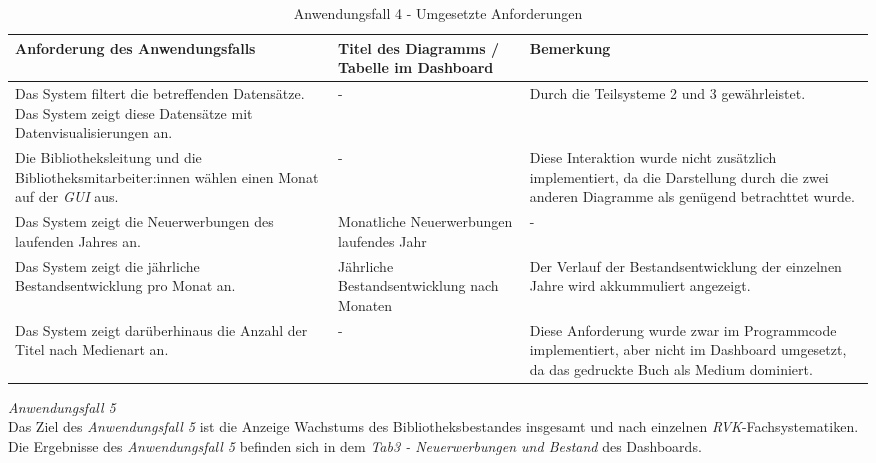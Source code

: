 \begingroup
    \setlength{\tabcolsep}{12pt} %
    \renewcommand{\arraystretch}{1.5} 
    \begin{table}[H]
        \centering
        \begin{adjustbox}{max width=\textwidth}
        \begin{tabular}{p{}p{}p{}}
           \toprule
           Anforderung des Anwendungsfalls        &Titel des Diagramms / Tabelle im Dashboard &Bemerkung\\
           \midrule
           Das System filtert die betreffenden Datensätze. Das System zeigt diese Datensätze mit Datenvisualisierungen an.&-&Durch die Teilsysteme 2  und 3 gewährleistet.\\
           Die Bibliotheksleitung und die Bibliotheksmitarbeiter:innen wählen einen Monat auf der \textit{\acrshort{GUI}} aus.&-&Diese Interaktion wurde nicht zusätzlich implementiert, da die Darstellung durch die zwei anderen Diagramme als genügend betrachttet wurde.\\
           Das System zeigt die Neuerwerbungen des laufenden Jahres an.&Monatliche Neuerwerbungen laufendes Jahr&-\\
           Das System zeigt die jährliche Bestandsentwicklung pro Monat an.&Jährliche Bestandsentwicklung nach Monaten&Der Verlauf der Bestandsentwicklung der einzelnen Jahre wird akkummuliert angezeigt.\\
           Das System zeigt darüberhinaus die Anzahl der Titel nach Medienart an.&-&Diese Anforderung wurde zwar im Programmcode implementiert, aber nicht im Dashboard umgesetzt, da das gedruckte Buch als Medium dominiert.\\

        \bottomrule
        \end{tabular}
        \end{adjustbox}
        \caption{%
            Anwendungsfall 4 - Umgesetzte Anforderungen
        }
        \label{tab:Anwendungsfall 4 - Umgesetzte Anforderungen}
        \end{table}


\noindent
\textit{Anwendungsfall 5}\\
Das Ziel des \textit{Anwendungsfall 5} ist die Anzeige Wachstums des Bibliotheksbestandes insgesamt und nach einzelnen \textit{\acrshort{RVK}}-Fachsystematiken.
Die Ergebnisse des \textit{Anwendungsfall 5} befinden sich in dem \textit{Tab3 - Neuerwerbungen und Bestand} des Dashboards.

